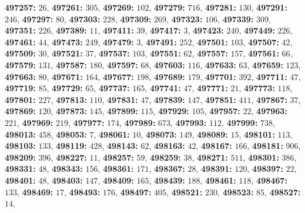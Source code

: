 \textsf{\bfseries 497257:} $26$, \textsf{\bfseries 497261:} $305$, \textsf{\bfseries 497269:} $102$, \textsf{\bfseries 497279:} $716$, \textsf{\bfseries 497281:} $130$, \textsf{\bfseries 497291:} $246$, \textsf{\bfseries 497297:} $80$, \textsf{\bfseries 497303:} $228$, \textsf{\bfseries 497309:} $269$, \textsf{\bfseries 497323:} $106$, \textsf{\bfseries 497339:} $309$, \textsf{\bfseries 497351:} $226$, \textsf{\bfseries 497389:} $11$, \textsf{\bfseries 497411:} $39$, \textsf{\bfseries 497417:} $3$, \textsf{\bfseries 497423:} $240$, \textsf{\bfseries 497449:} $226$, \textsf{\bfseries 497461:} $44$, \textsf{\bfseries 497473:} $249$, \textsf{\bfseries 497479:} $3$, \textsf{\bfseries 497491:} $252$, \textsf{\bfseries 497501:} $103$, \textsf{\bfseries 497507:} $42$, \textsf{\bfseries 497509:} $30$, \textsf{\bfseries 497521:} $37$, \textsf{\bfseries 497537:} $103$, \textsf{\bfseries 497551:} $62$, \textsf{\bfseries 497557:} $157$, \textsf{\bfseries 497561:} $66$, \textsf{\bfseries 497579:} $131$, \textsf{\bfseries 497587:} $180$, \textsf{\bfseries 497597:} $68$, \textsf{\bfseries 497603:} $116$, \textsf{\bfseries 497633:} $63$, \textsf{\bfseries 497659:} $123$, \textsf{\bfseries 497663:} $80$, \textsf{\bfseries 497671:} $164$, \textsf{\bfseries 497677:} $198$, \textsf{\bfseries 497689:} $179$, \textsf{\bfseries 497701:} $392$, \textsf{\bfseries 497711:} $47$, \textsf{\bfseries 497719:} $85$, \textsf{\bfseries 497729:} $65$, \textsf{\bfseries 497737:} $165$, \textsf{\bfseries 497741:} $47$, \textsf{\bfseries 497771:} $21$, \textsf{\bfseries 497773:} $118$, \textsf{\bfseries 497801:} $227$, \textsf{\bfseries 497813:} $110$, \textsf{\bfseries 497831:} $47$, \textsf{\bfseries 497839:} $147$, \textsf{\bfseries 497851:} $411$, \textsf{\bfseries 497867:} $37$, \textsf{\bfseries 497869:} $120$, \textsf{\bfseries 497873:} $145$, \textsf{\bfseries 497899:} $115$, \textsf{\bfseries 497929:} $105$, \textsf{\bfseries 497957:} $22$, \textsf{\bfseries 497963:} $221$, \textsf{\bfseries 497969:} $219$, \textsf{\bfseries 497977:} $174$, \textsf{\bfseries 497989:} $673$, \textsf{\bfseries 497993:} $112$, \textsf{\bfseries 497999:} $738$, \textsf{\bfseries 498013:} $458$, \textsf{\bfseries 498053:} $7$, \textsf{\bfseries 498061:} $10$, \textsf{\bfseries 498073:} $149$, \textsf{\bfseries 498089:} $15$, \textsf{\bfseries 498101:} $113$, \textsf{\bfseries 498103:} $133$, \textsf{\bfseries 498119:} $428$, \textsf{\bfseries 498143:} $62$, \textsf{\bfseries 498163:} $42$, \textsf{\bfseries 498167:} $166$, \textsf{\bfseries 498181:} $906$, \textsf{\bfseries 498209:} $396$, \textsf{\bfseries 498227:} $11$, \textsf{\bfseries 498257:} $59$, \textsf{\bfseries 498259:} $38$, \textsf{\bfseries 498271:} $511$, \textsf{\bfseries 498301:} $386$, \textsf{\bfseries 498331:} $48$, \textsf{\bfseries 498343:} $156$, \textsf{\bfseries 498361:} $171$, \textsf{\bfseries 498367:} $28$, \textsf{\bfseries 498391:} $120$, \textsf{\bfseries 498397:} $22$, \textsf{\bfseries 498401:} $48$, \textsf{\bfseries 498403:} $147$, \textsf{\bfseries 498409:} $165$, \textsf{\bfseries 498439:} $188$, \textsf{\bfseries 498461:} $118$, \textsf{\bfseries 498467:} $133$, \textsf{\bfseries 498469:} $17$, \textsf{\bfseries 498493:} $176$, \textsf{\bfseries 498497:} $405$, \textsf{\bfseries 498521:} $230$, \textsf{\bfseries 498523:} $85$, \textsf{\bfseries 498527:} $14$, 
